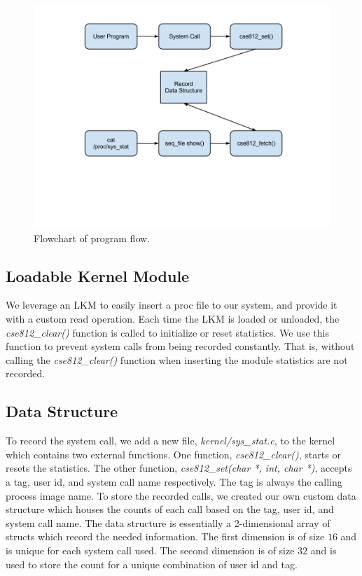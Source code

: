 \documentclass[conference]{IEEEtran}
\begin{document}
\begin{figure}[t!]
  \begin{center}
    \includegraphics[trim=120 230 90 50, clip, width=1.0\linewidth]{figure.png}
    \vspace{-0.18in}
  \end{center}
  \caption{Flowchart of program flow.}
  \label{fig:figure}
\end{figure}

\subsection{Loadable Kernel Module}
We leverage an LKM to easily insert a proc file to our system, and provide it with a custom read operation.
Each time the LKM is loaded or unloaded, the \textit{cse812\_clear()} function is called to initialize or reset statistics.
We use this function to prevent system calls from being recorded constantly.
That is, without calling the \textit{cse812\_clear()} function when inserting the module statistics are not recorded.

\subsection{Data Structure}
To record the system call, we add a new file, \textit{kernel/sys\_stat.c}, to the kernel which contains two external functions.
One function, \textit{cse812\_clear()}, starts or resets the statistics.
The other function, \textit{cse812\_set(char *, int, char *)}, accepts a tag, user id, and system call name respectively.
The tag is always the calling process image name.
To store the recorded calls, we created our own custom data structure which houses the counts of each call based on the tag, user id, and system call name.
The data structure is essentially a 2-dimensional array of structs which record the needed information.
The first dimension is of size $16$ and is unique for each system call used.
The second dimension is of size $32$ and is used to store the count for a unique combination of user id and tag.
\end{document}
